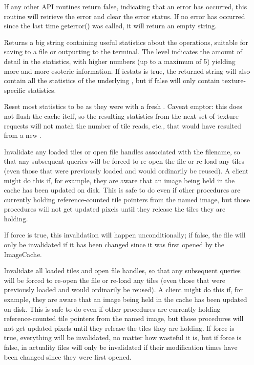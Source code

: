 If any other API routines return {\cf false}, indicating that an
error has occurred, this routine will retrieve the error and clear
the error status.  If no error has occurred since the last time
{\cf geterror()} was called, it will return an empty string.
\apiend

Returns a big string containing useful statistics about the \ImageCache
operations, suitable for saving to a file or outputting to the terminal.
The {\cf level} indicates the amount of detail in the statistics,
with higher numbers (up to a maximum of 5) yielding more and more
esoteric information.  If {\cf icstats} is true, the returned string
will also contain all the statistics of the underlying \ImageCache,
but if false will only contain texture-specific statistics.
\apiend

Reset most statistics to be as they were with a fresh
\ImageCache.  Caveat emptor: this does not flush the cache
itelf, so the resulting statistics from the next set of texture
requests will not match the number of tile reads, etc., that
would have resulted from a new \ImageCache.
\apiend

Invalidate any loaded tiles or open file handles associated with
the filename, so that any subsequent queries will be forced to
re-open the file or re-load any tiles (even those that were
previously loaded and would ordinarily be reused).  A client
might do this if, for example, they are aware that an image
being held in the cache has been updated on disk.  This is safe
to do even if other procedures are currently holding 
reference-counted tile pointers from the named image, but those 
procedures will not get updated pixels until they release the 
tiles they are holding.

If {\cf force} is true, this invalidation will happen unconditionally; if
false, the file will only be invalidated if it has been changed since it was
first opened by the ImageCache.
\apiend

Invalidate all loaded tiles and open file handles, so that any
subsequent queries will be forced to re-open the file or re-load any
tiles (even those that were previously loaded and would ordinarily be
reused).  A client might do this if, for example, they are aware that an
image being held in the cache has been updated on disk.  This is safe to
do even if other procedures are currently holding reference-counted tile
pointers from the named image, but those procedures will not get updated
pixels until they release the tiles they are holding.  If force is true,
everything will be invalidated, no matter how wasteful it is, but if
force is false, in actuality files will only be invalidated if their
modification times have been changed since they were first opened.
\apiend

